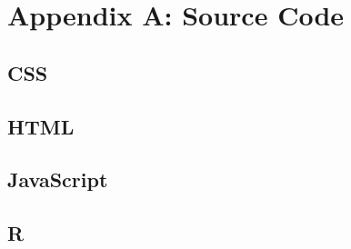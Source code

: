 \documentclass[12pt]{article}
\begin{document}








\section{Appendix A: Source Code}

\subsection{CSS}

\subsection{HTML}

\subsection{JavaScript}

\subsection{R}
\end{document}
